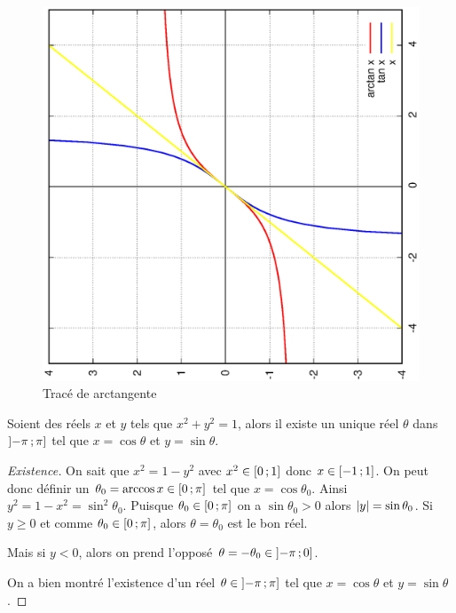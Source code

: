 \begin{figure}
  \centering
  \includegraphics[scale=0.4,angle=-90]{arctan.ps}
  \caption{Tracé de arctangente}
  \label{fig:tracearctangente}
\end{figure}
%
\begin{theo}
  \label{chap1-theo:thetasin}
  Soient des réels $x$ et $y$ tels que $x^2+y^2=1$, alors il existe un unique réel $\theta$ dans $\left] -\pi \, ;  \pi \right]$ tel que $x=\cos \theta$ et $y=\sin \theta$.
\end{theo}
\begin{proof}[Existence]
  On sait que $x^2=1-y^2$ avec $x^2 \in \left[ 0 \, ;  1 \right]$ donc $x \in \left[ -1 \, ;  1 \right]$. On peut donc définir un $\theta_0=\arccos x \in \left[ 0 \, ;  \pi \right]$ tel que $x=\cos \theta_0$. Ainsi $y^2=1-x^2=\sin^2 \theta_0$. Puisque $\theta_0 \in \left[ 0 \, ;  \pi \right]$ on a $\sin \theta_0>0$ alors $\left\lvert y\right\rvert=\sin \theta_0$. 
Si $y \geq 0$ et comme $\theta_0 \in \left[ 0 \, ;  \pi \right]$, alors $\theta=\theta_0$ est le bon réel. 

Mais si $y<0$, alors on prend l'opposé $\theta=-\theta_0 \in \left] -\pi \, ;  0 \right]$.

On a bien montré l'existence d'un réel $\theta \in \left] -\pi \, ;  \pi \right]$ tel que $x=\cos \theta$ et $y=\sin \theta$.
\end{proof}
